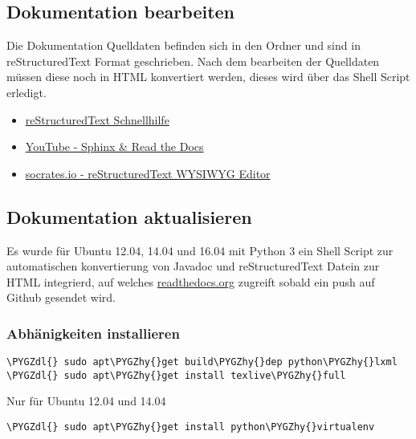 \documentclass[letterpaper,10pt,ngerman]{sphinxmanual}
\def\PYGZdl{\char`\$}
\def\PYGZhy{\char`\-}
\begin{document}
\subsection{Dokumentation bearbeiten}
\label{docs:dokumentation-bearbeiten}
Die Dokumentation Quelldaten befinden sich in den Ordner  und sind in reStructuredText Format geschrieben.
Nach dem bearbeiten der Quelldaten müssen diese noch in HTML konvertiert werden, dieses wird über das Shell Script
 erledigt.
\begin{itemize}
\item {} 
\href{http://docutils.sourceforge.net/docs/user/rst/quickref.html}{reStructuredText Schnellhilfe}

\item {} 
\href{https://www.youtube.com/watch?v=oJsUvBQyHBs}{YouTube - Sphinx \& Read the Docs}

\item {} 
\href{http://socrates.io/}{socrates.io - reStructuredText WYSIWYG Editor}

\end{itemize}


\subsection{Dokumentation aktualisieren}
\label{docs:dokumentation-aktualisieren}
Es wurde für Ubuntu 12.04, 14.04 und 16.04 mit Python 3 ein Shell Script zur automatischen konvertierung von Javadoc und reStructuredText Datein
zur HTML integrierd, auf welches \href{https://readthedocs.org/}{readthedocs.org} zugreift sobald ein push auf Github gesendet wird.


\subsubsection{Abhänigkeiten installieren}
\label{docs:abhanigkeiten-installieren}
\begin{Verbatim}[commandchars=\\\{\}]
\PYGZdl{} sudo apt\PYGZhy{}get build\PYGZhy{}dep python\PYGZhy{}lxml
\PYGZdl{} sudo apt\PYGZhy{}get install texlive\PYGZhy{}full
\end{Verbatim}

Nur für Ubuntu 12.04 und 14.04

\begin{Verbatim}[commandchars=\\\{\}]
\PYGZdl{} sudo apt\PYGZhy{}get install python\PYGZhy{}virtualenv
\end{Verbatim}
\end{document}
